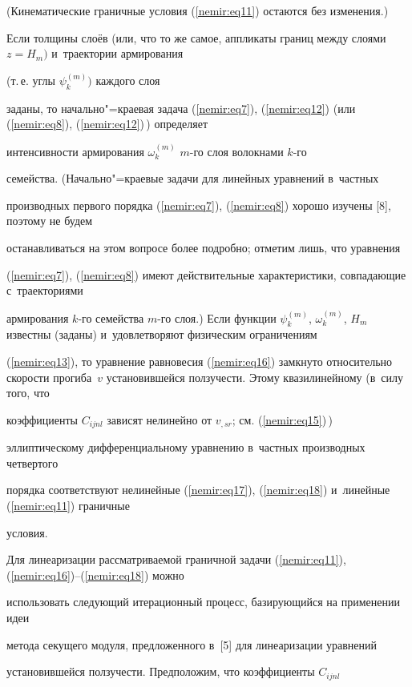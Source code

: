 (Кинематические граничные условия (\ref{nemir:eq11}) остаются без изменения.)



Если толщины слоёв (или, что то же самое, аппликаты границ между слоями $z = H_m )$ и~траектории армирования 

(т.\,е. углы $\psi _k^{(m)} )$ каждого слоя 

заданы, то начально"=краевая задача (\ref{nemir:eq7}), (\ref{nemir:eq12}) (или (\ref{nemir:eq8}), (\ref{nemir:eq12})\,) определяет 

интенсивности армирования $\omega _k^{(m)}$  $m$-го слоя волокнами $k$-го 

семейства. (Начально"=краевые задачи для линейных уравнений в~частных 

производных первого порядка (\ref{nemir:eq7}), (\ref{nemir:eq8}) хорошо изучены [8], поэтому не будем 

останавливаться на этом вопросе более подробно; отметим лишь, что уравнения 

(\ref{nemir:eq7}), (\ref{nemir:eq8}) имеют действительные характеристики, совпадающие с~траекториями 

армирования $k$-го семейства $m$-го слоя.) Если функции $\psi _k^{(m)} $, $\omega 

_k^{(m)} $, $H_m $ известны (заданы) и~удовлетворяют физическим ограничениям 

(\ref{nemir:eq13}), то уравнение равновесия (\ref{nemir:eq16}) замкнуто относительно скорости прогиба~$v$ установившейся ползучести. Этому квазилинейному (в~силу того, что 

коэффициенты $C_{ijnl} $ зависят нелинейно от $v_{,sr}$; см. (\ref{nemir:eq15})\,) 

эллиптическому дифференциальному уравнению в~частных производных четвертого 

порядка соответствуют нелинейные (\ref{nemir:eq17}), (\ref{nemir:eq18}) и~линейные (\ref{nemir:eq11}) граничные 

условия.



Для линеаризации рассматриваемой граничной задачи (\ref{nemir:eq11}), (\ref{nemir:eq16})--(\ref{nemir:eq18}) можно 

использовать следующий итерационный процесс, базирующийся на применении идеи 

метода секущего модуля, предложенного в~[5] для линеаризации уравнений 

установившейся ползучести. Предположим, что коэффициенты $C_{ijnl} $ 

